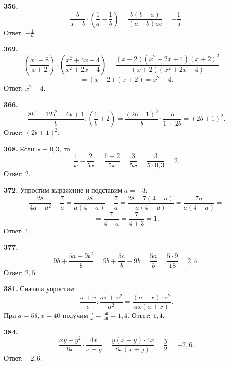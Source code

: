 \textbf{356.} $$\frac{b}{a-b}\cdot\left(\frac{1}{a}-\frac{1}{b}\right)=\frac{b\left(b-a\right)}{\left(a-b\right)ab}=-\frac{1}{a}.$$ \newline \null \hspace*{\fill} Ответ: $-\frac{1}{a}$. 

\textbf{362.} $$\left(\frac{x^3-8}{x+2}\right)\cdot\left(\frac{x^2+4x+4}{x^2+2x+4}\right)=\frac{\left(x-2\right)\left(x^2+2x+4\right)\left(x+2\right)^2}{\left(x+2\right)\left(x^2+2x+4\right)}=$$ $$=\left(x-2\right)\left(x+2\right)=x^2-4.$$ \newline \null \hspace*{\fill} Ответ: $x^2-4$. 

\textbf{366.} $$\frac{8b^3+12b^2+6b+1}{b}:\left(\frac{1}{b}+2\right)=\frac{\left(2b+1\right)^3}{b}\cdot\frac{b}{1+2b}=\left(2b+1\right)^2.$$ \newline \null \hspace*{\fill} Ответ: $\left(2b+1\right)^2$.

\textbf{368.} Если $x=0,3$, то $$\frac{1}{x}-\frac{2}{5x}=\frac{5-2}{5x}=\frac{3}{5x}=\frac{3}{5\cdot0,3}=2.$$ \newline \null \hspace*{\fill} Ответ: $2$. 

\textbf{372.}  Упростим выражение и подставим $a=-3$: $$\frac{28}{4a-a^2}-\frac{7}{a}=\frac{28}{a\left(4-a\right)}-\frac{7}{a}=\frac{28-7\left(4-a\right)}{a\left(4-a\right)}=\frac{7a}{a\left(4-a\right)}=$$ $$=\frac{7}{4-a}=\frac{7}{4+3}=1.$$ \newline \null \hspace*{\fill} Ответ: $1$.

\textbf{377.} $$9b+\frac{5a-9b^2}{b}=9b+\frac{5a}{b}-9b=\frac{5a}{b}=\frac{5\cdot9}{18}=2,5.$$ \newline \null \hspace*{\fill} Ответ: $2,5$.

\textbf{381.} Сначала упростим: $$\frac{a+x}{a}:\frac{ax+x^2}{a^2}=\frac{\left(a+x\right)\cdot a^2}{ax\left(a+x\right)}.$$ При $a=56,x=40$ получим $\frac{a}{x}=\frac{56}{40}=1,4$. \newline \null \hspace*{\fill} Ответ: $1,4$.

\textbf{384.} $$\frac{xy+y^2}{8x}\cdot\frac{4x}{x+y}=\frac{y\left(x+y\right)\cdot4x}{8x\left(x+y\right)}=\frac{y}{2}=-2,6.$$ \newline \null \hspace*{\fill} Ответ: $-2,6$. 

